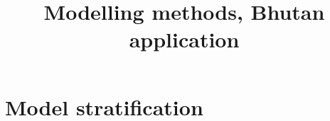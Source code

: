 \documentclass{article}
\title{Modelling methods, Bhutan application}
\begin{document}
\maketitle



\section{Model stratification}




\newpage
\printbibliography
\end{document}
